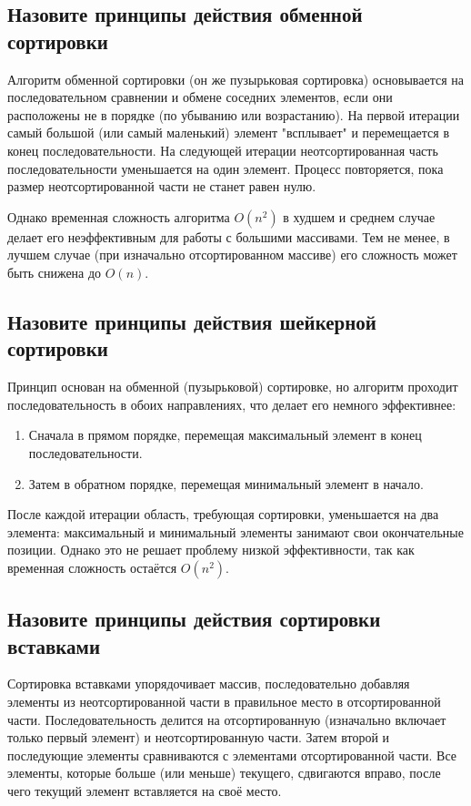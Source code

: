 \documentclass[a4paper,12pt]{article}
\begin{document}
	\subsection{Назовите принципы действия обменной сортировки}
	
	Алгоритм обменной сортировки (он же пузырьковая сортировка) основывается на последовательном сравнении и обмене соседних элементов, если они расположены не в порядке (по убыванию или возрастанию). На первой итерации самый большой (или самый маленький) элемент "всплывает" и перемещается в конец последовательности. На следующей итерации неотсортированная часть последовательности уменьшается на один элемент. Процесс повторяется, пока размер неотсортированной части не станет равен нулю.
	
	Однако временная сложность алгоритма $O(n^{2})$ в худшем и среднем случае делает его неэффективным для работы с большими массивами. Тем не менее, в лучшем случае (при изначально отсортированном массиве) его сложность может быть снижена до $O(n)$.
	
	\subsection{Назовите принципы действия шейкерной сортировки}

	Принцип основан на обменной (пузырьковой) сортировке, но алгоритм проходит последовательность в обоих направлениях, что делает его немного эффективнее:
	\begin{enumerate}	
	\item Сначала в прямом порядке, перемещая максимальный элемент в конец последовательности.
	\item Затем в обратном порядке, перемещая минимальный элемент в начало.
	\end{enumerate}
	После каждой итерации область, требующая сортировки, уменьшается на два элемента: максимальный и минимальный элементы занимают свои окончательные позиции. Однако это не решает проблему низкой эффективности, так как временная сложность остаётся $O(n^{2})$.

	\subsection{Назовите принципы действия сортировки вставками}
	
	Сортировка вставками упорядочивает массив, последовательно добавляя элементы из неотсортированной части в правильное место в отсортированной части. Последовательность делится на отсортированную (изначально включает только первый элемент) и неотсортированную части. Затем второй и последующие элементы сравниваются с элементами отсортированной части. Все элементы, которые больше (или меньше) текущего, сдвигаются вправо, после чего текущий элемент вставляется на своё место.
	
\end{document}
